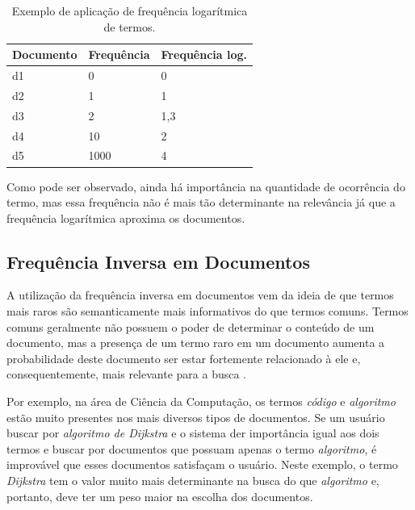 \begin{table}[H]
	\centering
	\caption{Exemplo de aplicação de frequência logarítmica de termos.}
	\label{tab:log-tf-table}
	\def\arraystretch{1.2} %
	\begin{tabular}{|m{3cm} | m{3cm} | m{3cm} |}

		\hline
		
		\multicolumn{1}{|c|}{\bfseries Documento } & \multicolumn{1}{c|}{\bfseries Frequência} & \multicolumn{1}{c|}{\bfseries Frequência log.}\\ \hline
		d1   					&	0		&	0 	\\ \hline
		d2   					&	1		&	1 	\\ \hline
		d3   					&	2		&	1,3 \\ \hline
		d4   					&	10		&	2	\\ \hline
		d5   					&	1000	&	4 	\\ \hline
		
	\end{tabular}
\end{table}

Como pode ser observado, ainda há importância na quantidade de ocorrência do termo, mas essa frequência não é mais tão determinante na relevância já que a frequência logarítmica aproxima os documentos.

\subsection{Frequência Inversa em Documentos}

 A utilização da frequência inversa em documentos vem da ideia de que termos mais raros são semanticamente mais informativos do que termos comuns. Termos comuns geralmente não possuem o poder de determinar o conteúdo de um documento, mas a presença de um termo raro em um documento aumenta a probabilidade deste documento ser estar fortemente relacionado à ele e, consequentemente, mais relevante para a busca \citep{Manning2008}.

Por exemplo, na área de Ciência da Computação, os termos \textit{código} e \textit{algoritmo} estão muito presentes nos mais diversos tipos de documentos. Se um usuário buscar por \textit{algoritmo de Dijkstra} e o sistema der importância igual aos dois termos e buscar por documentos que possuam apenas o termo \textit{algoritmo}, é improvável que esses documentos satisfaçam o usuário. Neste exemplo, o termo \textit{Dijkstra} tem o valor muito mais determinante na busca do que \textit{algoritmo} e, portanto, deve ter um peso maior na escolha dos documentos.

